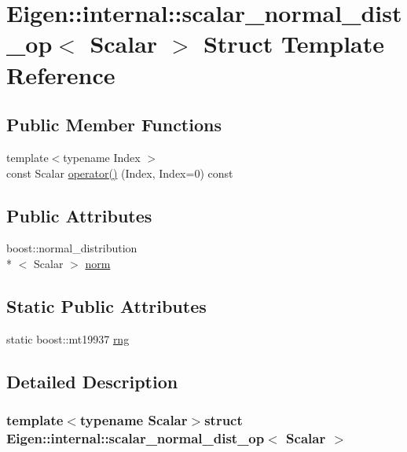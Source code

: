 \hypertarget{struct_eigen_1_1internal_1_1scalar__normal__dist__op}{\section{Eigen\+:\+:internal\+:\+:scalar\+\_\+normal\+\_\+dist\+\_\+op$<$ Scalar $>$ Struct Template Reference}
\label{struct_eigen_1_1internal_1_1scalar__normal__dist__op}
}
\subsection*{Public Member Functions}
\begin{DoxyCompactItemize}
\item 
{\footnotesize template$<$typename Index $>$ }\\const Scalar \hyperlink{struct_eigen_1_1internal_1_1scalar__normal__dist__op_a06ff4908382c1360169dce38b93463da}{operator()} (Index, Index=0) const 
\end{DoxyCompactItemize}
\subsection*{Public Attributes}
\begin{DoxyCompactItemize}
\item 
boost\+::normal\+\_\+distribution\\*
$<$ Scalar $>$ \hyperlink{struct_eigen_1_1internal_1_1scalar__normal__dist__op_a2838ee2b54942da88f385babd6b01bbf}{norm}
\end{DoxyCompactItemize}
\subsection*{Static Public Attributes}
\begin{DoxyCompactItemize}
\item 
static boost\+::mt19937 \hyperlink{struct_eigen_1_1internal_1_1scalar__normal__dist__op_aa088a6e6b0b17b44a1e409fd8e024969}{rng}
\end{DoxyCompactItemize}


\subsection{Detailed Description}
\subsubsection*{template$<$typename Scalar$>$struct Eigen\+::internal\+::scalar\+\_\+normal\+\_\+dist\+\_\+op$<$ Scalar $>$}



